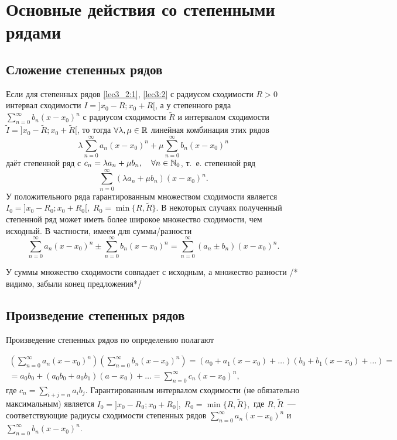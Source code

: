\documentclass[../../main.tex]{subfiles}
\begin{document}
    \section{Основные действия со степенными рядами}
    \subsection{Сложение степенных рядов}
    
    Если для степенных рядов \eqref{lec3_2:1}, \eqref{lec3:2}  с радиусом 
    сходимости $R > 0$ интервал сходимости $I = ]x_0-R; x_0 + R[$, а у 
    степенного ряда $\sum\limits_{n = 0}^{\infty} b_n(x-x_0)^n$ с радиусом 
    сходимости $\widetilde R$ и интервалом сходимости $\widetilde I = 
    ]x_0-\widetilde R; x_0 + \widetilde R[$, то тогда $\forall \lambda, \mu 
    \in 
    \mathbb{R}$ линейная комбинация этих рядов
    \[\lambda \sum\limits_{n = 0}^{\infty}a_n(x-x_0)^n + \mu 
    \sum\limits_{n = 0}^{\infty} b_n(x-x_0)^n \]
    даёт степенной ряд с $c_n = \lambda a_n + \mu b_n, \quad \forall n \in 
    \mathbb{N}_0$, т.~е. степенной ряд
    \[ \sum\limits_{n = 0}^{\infty}(\lambda a_n + \mu b_n)(x-x_0)^n. \]
    У положительного ряда гарантированным множеством сходимости является 
    $I_0 = ]x_0-R_0; x_0 + R_0[, \; R_0 = \min \{R, \widetilde R\}$. В 
    некоторых случаях полученный степенной ряд может иметь более широкое 
    множество сходимости, чем исходный. В частности, имеем для суммы/разности
    \[ \sum\limits_{n = 0}^{\infty}a_n(x-x_0)^n \pm 
    \sum\limits_{n = 0}^{\infty}b_n(x-x_0)^n = 
    \sum\limits_{n = 0}^{\infty}(a_n \pm b_n) (x-x_0)^n.  \]

    У суммы множество сходимости совпадает с исходным, а множество разности 
    /* видимо, забыли конец предложения*/
    
    \subsection{Произведение степенных рядов}
    Произведение степенных рядов по определению полагают

    \begin{multline*}
        \left( \sum\limits_{n = 0}^{\infty}a_n(x-x_0)^n \right)
        \left( \sum\limits_{n = 0}^{\infty}b_n(x-x_0)^n \right) = 
        (a_0 + a_1(x - x_0) + \ldots)(b_0 + b_1(x - x_0) + \ldots) =
        \\ = a_0b_0 + (a_0b_0 + a_0b_1)(a - x_0) + \ldots = 
        \sum\limits_{n = 0}^{\infty}c_n(x-x_0)^n, 
    \end{multline*}
    где $c_n = \sum\limits_{i + j = n} a_ib_j$. Гарантированным интервалом 
    сходимости (не обязательно максимальным) является $I_0 = ]x_0-R_0; x_0 + 
    R_0[, \; R_0 = \min \{R, \widetilde R\},$ где $R, \widetilde R$~--- 
    соответствующие радиусы сходимости степенных рядов $\sum\limits_{n = 0}^
    {\infty}a_n(x-x_0)^n$ и $\sum\limits_{n = 0}^{\infty}b_n(x-x_0)^n$.
    
\end{document}
